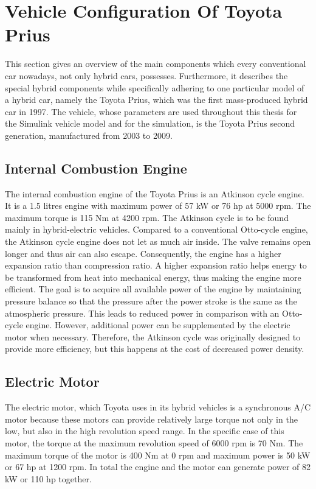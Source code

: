 \section{Vehicle Configuration Of Toyota Prius}
This section gives an overview of the main components which every conventional car nowadays, not only hybrid cars, possesses. Furthermore, it describes the special hybrid components while specifically adhering to one particular model of a hybrid car, namely the Toyota Prius, which was the first mass-produced hybrid car in 1997. The vehicle, whose parameters are used throughout this thesis for the Simulink vehicle model and for the simulation, is the Toyota Prius second generation, manufactured from 2003 to 2009.

\subsection{Internal Combustion Engine}
The internal combustion engine of the Toyota Prius is an Atkinson cycle engine. It is a 1.5 litres engine with maximum power of 57 kW or 76 hp at 5000 rpm. The maximum torque is 115 Nm at 4200 rpm. The Atkinson cycle is to be found mainly in hybrid-electric vehicles. Compared to a conventional Otto-cycle engine, the Atkinson cycle engine does not let as much air inside. The valve remains open longer and thus air can also escape. Consequently, the engine has a higher expansion ratio than compression ratio. A higher expansion ratio helps energy to be transformed from heat into mechanical energy, thus making the engine more efficient. The goal is to acquire all available power of the engine by maintaining pressure balance so that the pressure after the power stroke is the same as the atmospheric pressure. This leads to reduced power in comparison with an Otto-cycle engine. However, additional power can be supplemented by the electric motor when necessary. Therefore, the Atkinson cycle was originally designed to provide more efficiency, but this happens at the cost of decreased power density. 

\subsection{Electric Motor}
The electric motor, which Toyota uses in its hybrid vehicles is a synchronous A/C motor because these motors can provide relatively large torque not only in the low, but also in the high revolution speed range. In the specific case of this motor, the torque at the maximum revolution speed of 6000 rpm is 70 Nm. The maximum torque of the motor is 400 Nm at 0 rpm and maximum power is 50 kW or 67 hp at 1200 rpm. In total the engine and the motor can generate power of 82 kW or 110 hp together.

